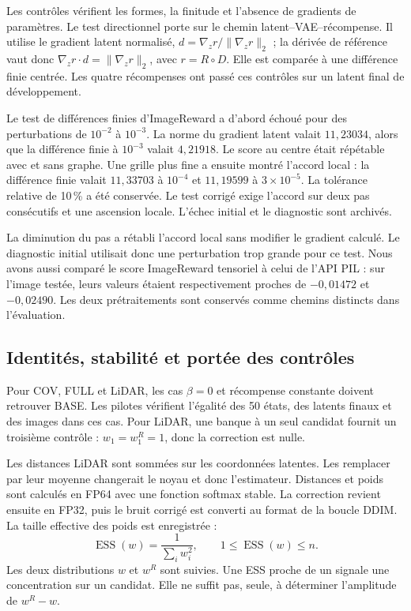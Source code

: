 \documentclass[11pt,a4paper]{article}
\newcommand{\ESS}{\operatorname{ESS}}
\begin{document}
Les contrôles vérifient les formes, la finitude et l'absence de gradients de paramètres. Le test directionnel porte sur le chemin latent--VAE--récompense. Il utilise le gradient latent normalisé, $d=\nabla_zr/\lVert\nabla_zr\rVert_2$ ; la dérivée de référence vaut donc $\nabla_zr\cdot d=\lVert\nabla_zr\rVert_2$, avec $r=R\circ D$. Elle est comparée à une différence finie centrée. Les quatre récompenses ont passé ces contrôles sur un latent final de développement.

Le test de différences finies d'ImageReward a d'abord échoué pour des perturbations de $10^{-2}$ à $10^{-3}$. La norme du gradient latent valait $11{,}23034$, alors que la différence finie à $10^{-3}$ valait $4{,}21918$. Le score au centre était répétable avec et sans graphe. Une grille plus fine a ensuite montré l'accord local : la différence finie valait $11{,}33703$ à $10^{-4}$ et $11{,}19599$ à $3\times10^{-5}$. La tolérance relative de 10\,\% a été conservée. Le test corrigé exige l'accord sur deux pas consécutifs et une ascension locale. L'échec initial et le diagnostic sont archivés.

La diminution du pas a rétabli l'accord local sans modifier le gradient calculé. Le diagnostic initial utilisait donc une perturbation trop grande pour ce test. Nous avons aussi comparé le score ImageReward tensoriel à celui de l'API PIL : sur l'image testée, leurs valeurs étaient respectivement proches de $-0{,}01472$ et $-0{,}02490$. Les deux prétraitements sont conservés comme chemins distincts dans l'évaluation.

\subsection{Identités, stabilité et portée des contrôles}
Pour COV, FULL et LiDAR, les cas $\beta=0$ et récompense constante doivent retrouver BASE. Les pilotes vérifient l'égalité des 50 états, des latents finaux et des images dans ces cas. Pour LiDAR, une banque à un seul candidat fournit un troisième contrôle : $w_1=w_1^R=1$, donc la correction est nulle.

Les distances LiDAR sont sommées sur les coordonnées latentes. Les remplacer par leur moyenne changerait le noyau et donc l'estimateur. Distances et poids sont calculés en FP64 avec une fonction softmax stable. La correction revient ensuite en FP32, puis le bruit corrigé est converti au format de la boucle DDIM. La taille effective des poids est enregistrée :
\begin{equation}\label{eq:ess}
\ESS(w)=\frac{1}{\sum_iw_i^2},\qquad 1\leq\ESS(w)\leq n.
\end{equation}
Les deux distributions $w$ et $w^R$ sont suivies. Une ESS proche de un signale une concentration sur un candidat. Elle ne suffit pas, seule, à déterminer l'amplitude de $w^R-w$.
\end{document}
